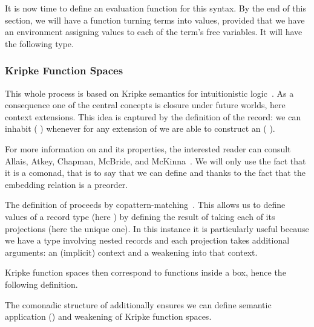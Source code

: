 It is now time to define an evaluation function for this syntax.
By the end of this section, we will have a function 
turning terms into values,
provided that we have an environment assigning values
to each of the term's free variables. It will have the following type.


\subsubsection{Kripke Function Spaces}

This whole process is based on Kripke semantics for intuitionistic
logic~\cite{DBLP:journals/apal/MitchellM91}.
As a consequence one of the central concepts is closure under future
worlds, here context extensions.
This idea is captured by the definition of the  record: we
can inhabit (  ) whenever for any extension
 of  we are able to construct an ( ).


For more information on  and its properties, the interested
reader can consult Allais, Atkey, Chapman, McBride, and
McKinna~\cite[Section~3.1]{DBLP:journals/jfp/AllaisACMM21}.
%
We will only use the fact that it is a comonad, that is to say that
we can define  and  thanks to
the fact that the embedding relation is a preorder.


\begin{remark}
The definition of  proceeds by
copattern-matching~\cite{DBLP:conf/popl/AbelPTS13}.
This allows us to define values of a record type
(here ) by defining the result of taking
each of its projections (here the unique  one).
In this instance it is particularly useful because we have
a type involving nested records and each projection takes
additional arguments: an (implicit) context and a weakening
into that context.
\end{remark}

Kripke function spaces then correspond to functions inside a box,
hence the following definition.


The comonadic structure of  additionally ensures we can define
semantic application (\AF{\_\$\$\_}) and weakening of Kripke function
spaces.

